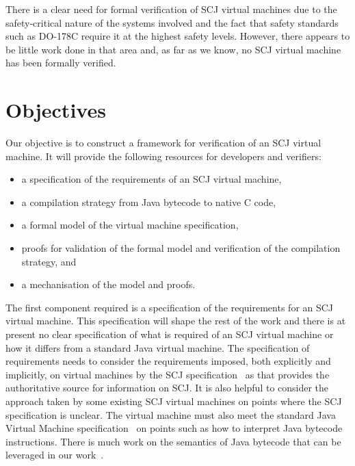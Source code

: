 \documentclass[a4paper,10pt]{report}
\begin{document}
There is a clear need for formal verification of SCJ virtual machines due to the
safety-critical nature of the systems involved and the fact that safety
standards such as DO-178C require it at the highest safety levels. However,
there appears to be little work done in that area and, as far as we know, no SCJ
virtual machine has been formally verified.


\section{Objectives}

Our objective is to construct a framework for verification of an SCJ virtual
machine.  It will provide the following resources for developers and verifiers:
\begin{itemize}
\item a specification of the requirements of an SCJ virtual machine,
\item a compilation strategy from Java bytecode to native C code,
\item a formal model of the virtual machine specification,
\item proofs for validation of the formal model and verification of the
  compilation strategy, and
\item a mechanisation of the model and proofs.
\end{itemize}

The first component required is a specification of the requirements for an SCJ
virtual machine. This specification will shape the rest of the work and there is
at present no clear specification of what is required of an SCJ virtual machine
or how it differs from a standard Java virtual machine.  The specification of
requirements needs to consider the requirements imposed, both explicitly and
implicitly, on virtual machines by the SCJ specification~\cite{locke2013} as
that provides the authoritative source for information on SCJ.  It is also
helpful to consider the approach taken by some existing SCJ virtual machines on
points where the SCJ specification is unclear.  The virtual machine must also
meet the standard Java Virtual Machine specification~\cite{lindholm2014} on
points such as how to interpret Java bytecode instructions.  There is much work
on the semantics of Java bytecode that can be leveraged in our
work~\cite{bertelsen2000, jones1998, stark2001}.
\end{document}
